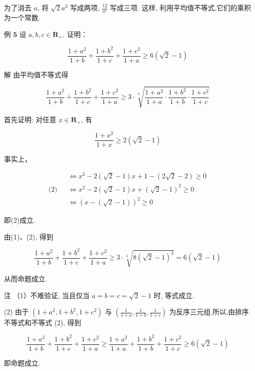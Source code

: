 \begin{note}
	为了消去 $a$, 将 $\sqrt{2} a^{3}$ 写成两项, $\frac{12}{a^{2}}$ 写成三项. 这样, 利用平均值不等式,它们的乘积为一个常数.
	
	例 $\mathbf{5}$ 设 $a, b, c \in \mathbf{R}_{+}$. 证明：
	
	$$
	\frac{1+a^{2}}{1+b}+\frac{1+b^{2}}{1+c}+\frac{1+c^{2}}{1+a} \geqslant 6(\sqrt{2}-1)
	$$
	
	解 由平均值不等式得
	
	
	\begin{equation*}
	\frac{1+a^{2}}{1+b}+\frac{1+b^{2}}{1+c}+\frac{1+c^{2}}{1+a} \geqslant 3 \cdot \sqrt[3]{\frac{1+a^{2}}{1+a} \cdot \frac{1+b^{2}}{1+b} \cdot \frac{1+c^{2}}{1+c}} \tag{1}
	\end{equation*}
	
	
	首先证明: 对任意 $x \in \mathbf{R}_{+}$, 有
	
	
	\begin{equation*}
	\frac{1+x^{2}}{1+x} \geqslant 2(\sqrt{2}-1) \tag{2}
	\end{equation*}
	
	
	事实上，
	
	$$
	\text { (2) } \begin{aligned}
	& \Leftrightarrow x^{2}-2(\sqrt{2}-1) x+1-(2 \sqrt{2}-2) \geqslant 0 \\
	& \Leftrightarrow x^{2}-2(\sqrt{2}-1) x+(\sqrt{2}-1)^{2} \geqslant 0 \\
	& \Leftrightarrow(x-(\sqrt{2}-1))^{2} \geqslant 0
	\end{aligned}
	$$
	
	即(2)成立.
	
	由(1)、(2), 得到
	
	$$
	\frac{1+a^{2}}{1+b}+\frac{1+b^{2}}{1+c}+\frac{1+c^{2}}{1+a} \geqslant 3 \cdot \sqrt[3]{8(\sqrt{2}-1)^{3}}=6(\sqrt{2}-1)
	$$
	
	从而命题成立.
	
	注 （1）不难验证, 当且仅当 $a=b=c=\sqrt{2}-1$ 时, 等式成立.
	
	(2) 由于 $\left(1+a^{2}, 1+b^{2}, 1+c^{2}\right)$ 与 $\left(\frac{1}{1+a}, \frac{1}{1+b}, \frac{1}{1+c}\right)$ 为反序三元组.所以,由排序不等式和不等式 (2), 得到
	
	$$
	\frac{1+a^{2}}{1+b}+\frac{1+b^{2}}{1+c}+\frac{1+c^{2}}{1+a} \geqslant \frac{1+a^{2}}{1+a}+\frac{1+b^{2}}{1+b}+\frac{1+c^{2}}{1+c} \geqslant 6(\sqrt{2}-1)
	$$
	
	即命题成立.
\end{note}


